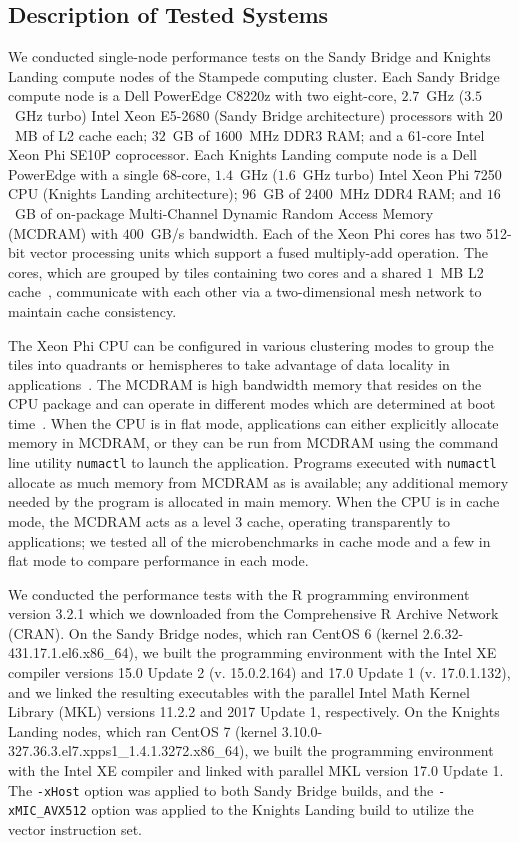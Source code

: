 \subsection{Description of Tested Systems}
We conducted single-node performance tests on the Sandy Bridge and Knights
  Landing compute nodes of the Stampede computing cluster.
Each Sandy Bridge compute node is a Dell PowerEdge C8220z with two eight-core,
  $2.7$~GHz ($3.5$~GHz turbo) Intel Xeon E5-2680 (Sandy Bridge architecture)
  processors with $20$~MB of L2 cache each; $32$~GB of $1600$~MHz DDR3 RAM; and
  a 61-core Intel Xeon Phi SE10P coprocessor.
Each Knights Landing compute node is a Dell PowerEdge with a single 68-core,
  $1.4$~GHz ($1.6$~GHz turbo) Intel Xeon Phi 7250 CPU (Knights Landing
  architecture); $96$~GB of $2400$~MHz DDR4 RAM;
  and $16$~GB of on-package Multi-Channel Dynamic Random Access Memory (MCDRAM)
  with $400$~GB/s bandwidth.
Each of the Xeon Phi cores has two 512-bit vector processing units which
  support a fused multiply-add operation.
The cores, which are grouped by tiles containing two cores and a shared
  $1$~MB L2 cache~\cite{intel:xeonphi}, communicate with each other via a
  two-dimensional mesh network to maintain cache consistency.

The Xeon Phi CPU can be configured in various clustering modes to group the
  tiles into quadrants or hemispheres to take advantage of data locality in
  applications~\cite{vladimirov:knlModes}.
The MCDRAM is high bandwidth memory that resides on the CPU package and can
  operate in different modes which are determined at boot
  time~\cite{vladimirov:knlModes, asai:mcdramKnl}.
When the CPU is in flat mode, applications can either explicitly allocate memory
  in MCDRAM, or they can be run from MCDRAM using the command line utility
  \texttt{numactl} to launch the application.
Programs executed with \texttt{numactl} allocate as much memory from
  MCDRAM as is available; any additional memory needed by the program is
  allocated in main memory.
When the CPU is in cache mode, the MCDRAM acts as a level 3 cache, operating
  transparently to applications; we tested all of the microbenchmarks in
  cache mode and a few in flat mode to compare performance in each mode.

We conducted the performance tests with the R programming environment version
  3.2.1 which we downloaded from the Comprehensive R Archive Network (CRAN).
On the Sandy Bridge nodes, which ran CentOS 6 (kernel
  2.6.32-431.17.1.el6.x86\_64), we built the programming environment with
  the Intel XE compiler versions 15.0 Update 2 (v. 15.0.2.164) and
  17.0 Update 1 (v. 17.0.1.132), and we linked the resulting executables with
  the parallel Intel Math Kernel Library (MKL) versions 11.2.2 and 2017 Update
  1, respectively.
On the Knights Landing nodes, which ran CentOS 7 (kernel
  3.10.0-327.36.3.el7.xpps1\_1.4.1.3272.x86\_64), we built the programming
  environment with the Intel XE compiler and linked with parallel MKL
  version 17.0 Update 1.
The \texttt{-xHost} option was applied to both Sandy Bridge builds, and the
  \texttt{-xMIC\_AVX512} option was applied to the Knights Landing build to
  utilize the vector instruction set.

